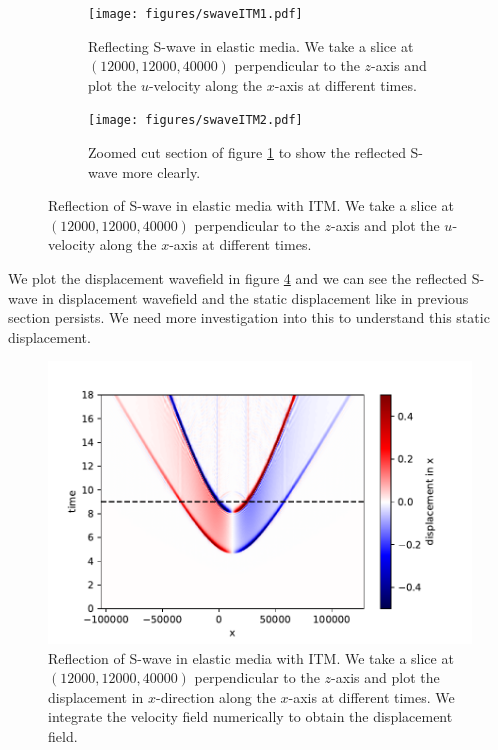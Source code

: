 \begin{figure}[htpb]
    \begin{subfigure}[t]{0.49\textwidth}   
        \centering 
        \texttt{[image: figures/swaveITM1.pdf]}
        \caption{Reflecting S-wave in elastic media. We take a slice at $\left(12000,12000,40000\right)$ perpendicular to the $z$-axis
        and plot the $u$-velocity along the $x$-axis at different times.}
        \label{subfig:swave}
    \end{subfigure}
    \hfill
    \begin{subfigure}[t]{0.49\textwidth}   
        \centering 
        \texttt{[image: figures/swaveITM2.pdf]}
        \caption{Zoomed cut section of figure \ref{subfig:swave} to show the reflected S-wave more clearly.}
        \label{subfig:swavezoomed}
    \end{subfigure}
    \caption{Reflection of S-wave in elastic media with \ac{ITM}. We take a slice at $\left(12000,12000,40000\right)$ perpendicular to the $z$-axis and plot the $u$-velocity along the $x$-axis at different times.}
    \label{fig:space-timeplot-swave}
\end{figure}
    
We plot the displacement wavefield in figure \ref{fig:space-timeplot-swavedisplacement} and we can see the reflected S-wave in displacement 
wavefield and the static displacement like in previous section persists. We need more investigation into this to understand this static displacement.

\begin{figure}[htpb]
    \centering
    \includegraphics[width=0.85\linewidth]{figures/swaveITMdisplacement.pdf}
    \caption{Reflection of S-wave in elastic media with \ac{ITM}. We take a slice at $\left(12000,12000,40000\right)$ perpendicular to the $z$-axis
    and plot the displacement in $x$-direction along the $x$-axis at different times. We integrate the velocity field numerically to obtain the displacement field.}
    \label{fig:space-timeplot-swavedisplacement}
\end{figure}

